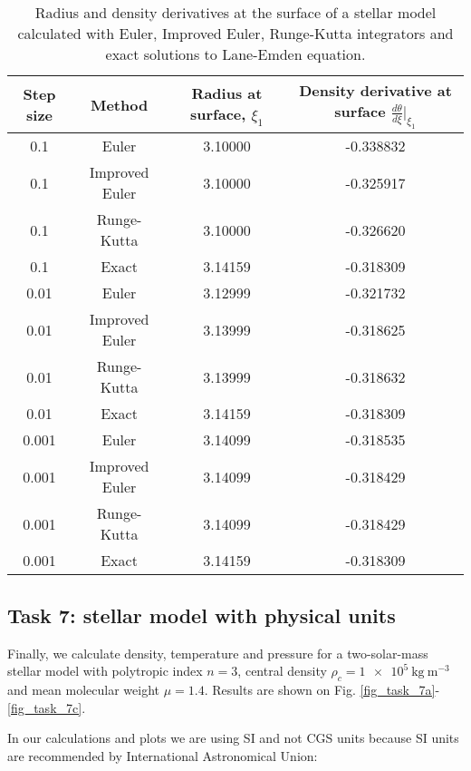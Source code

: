 \begin{table}[!ht]
\centering
\caption{Radius and density derivatives at the surface of a stellar model calculated with Euler, Improved Euler, Runge-Kutta integrators and exact solutions to Lane-Emden equation.}
\begin{tabular}{|c|c|c|c|}
\hline
\textbf{Step size} & \textbf{Method}  & \textbf{Radius at surface, $\xi_1$}   & \textbf{Density derivative at surface $\frac{d \theta}{d \xi} \big|_{\xi_1}$} \\
\hline
0.1       & Euler          & 3.10000 &  -0.338832 \\
\hline
0.1       & Improved Euler & 3.10000 &  -0.325917 \\
\hline
0.1       & Runge-Kutta    & 3.10000 &  -0.326620 \\
\hline
0.1       & Exact          & 3.14159 &  -0.318309 \\
\hline
0.01      & Euler          & 3.12999 &  -0.321732 \\
\hline
0.01      & Improved Euler & 3.13999  & -0.318625 \\
\hline
0.01      & Runge-Kutta    & 3.13999  & -0.318632 \\
\hline
0.01      & Exact          & 3.14159 &  -0.318309 \\
\hline
0.001     & Euler          & 3.14099  & -0.318535 \\
\hline
0.001     & Improved Euler & 3.14099  & -0.318429 \\
\hline
0.001     & Runge-Kutta    & 3.14099  & -0.318429 \\
\hline
0.001     & Exact          & 3.14159 &  -0.318309 \\
\hline
\end{tabular}
\label{q6_comparing_integrators}
\end{table}

\pagebreak


\subsection*{Task 7: stellar model with physical units}

Finally, we calculate density, temperature and pressure for a two-solar-mass stellar model with polytropic index $n=3$, central density $\rho_c = \SI{1e5}{\kg \ \m^{-3}}$ and mean molecular weight $\mu = 1.4$. Results are shown on Fig. \ref{fig_task_7a}-\ref{fig_task_7c}.

In our calculations and plots we are using SI and not CGS units because SI units are recommended by International Astronomical Union:

